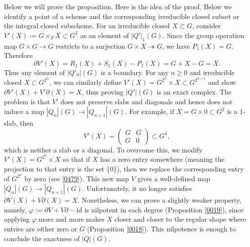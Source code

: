 \documentclass{amsart}
\theoremstyle{remark}
\numberwithin{equation}{subsection}
\newcommand{\onto}{\twoheadrightarrow}
\newcommand{\id}{\mathrm{id}}
\begin{document}
Below we will prove the proposition.
Here is the idea of the proof.
Below we identify a point of a scheme and the corresponding irreducible closed subset
or the integral closed subscheme.
For an irreducible closed $X \subset G$,
consider $V'(X) := G \times_{F} X \subset G^{2}$ as an element of $|Q'|_{1}(G)$.
Since the group operation map $G \times G \to G$ restricts to a surjection
$G \times X \onto G$, we have $P_{1}(X) = G$.
Therefore
	\[
			\partial V'(X)
		=
			R_{1}(X) + S_{1}(X) - P_{1}(X)
		=
			G + X - G
		=
			X.
	\]
Thus any element of $|Q'_{0}|(G)$ is a boundary.
For any $n \ge 0$ and irreducible closed $X \subset G^{2^{n}}$,
we can similarly define $V'(X) = G^{2^{n}} \times X \subset G^{2^{n + 1}}$
and show $\partial V'(X) + V' \partial(X) = X$,
thus proving $|Q'|(G)$ is an exact complex.
The problem is that $V'$ does not preserve slabs and diagonals
and hence does not induce a map $|Q_{n}|(G) \to |Q_{n + 1}|(G)$.
For example, if $X = G \times 0 \subset G^{2}$ is a $1$-slab,
then
	\[
			V'(X)
		=
			\begin{pmatrix}
				G & G \\
				G & 0
			\end{pmatrix}
		\subset
			G^{4},
	\]
which is neither a slab or a diagonal.
To overcome this, we modify $V'(X) = G^{2^{n}} \times X$
so that if $X$ has a zero entry somewhere
(meaning the projection to that entry is the set $\{0\}$),
then we replace the corresponding entry of $G^{2^{n}}$ by zero (see \eqref{0479}).
This new map $V$ gives a well-defined map $|Q_{n}|(G) \to |Q_{n + 1}|(G)$.
Unfortunately, it no longer satisfies $\partial V(X) + V \partial(X) = X$.
Nonetheless, we can prove a slightly weaker property,
namely, $\varphi := \partial V + V \partial - \id$
is nilpotent in each degree (Proposition \ref{0019}),
since applying $\varphi$ more and more makes $X$ closer and closer to the regular shape
where entries are either zero or $G$ (Proposition \ref{0018}).
This nilpotence is enough to conclude the exactness of $|Q|(G)$.
\end{document}
